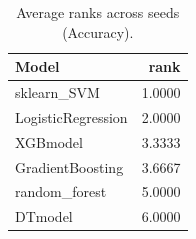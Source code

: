 \begin{table}[t]
\centering
\begin{tabular}{lr}
\toprule
Model & rank \\
\midrule
sklearn_SVM & 1.0000 \\
LogisticRegression & 2.0000 \\
XGBmodel & 3.3333 \\
GradientBoosting & 3.6667 \\
random_forest & 5.0000 \\
DTmodel & 6.0000 \\
\bottomrule
\end{tabular}
\caption{Average ranks across seeds (Accuracy).}
\label{tab:avg_rank_Accuracy}
\end{table}